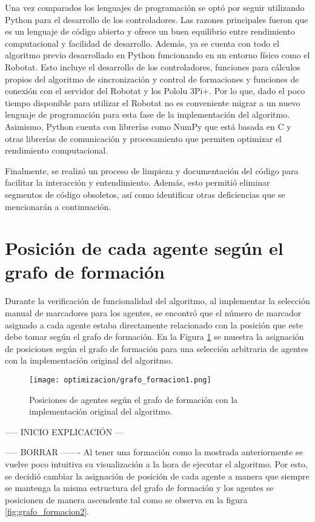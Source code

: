 Una vez comparados los lenguajes de programación se optó por seguir utilizando Python para el desarrollo de los controladores. Las razones principales fueron que es un lenguaje de código abierto y ofrece un buen equilibrio entre rendimiento computacional y facilidad de desarrollo. Además, ya se cuenta con todo el algoritmo previo desarrollado en Python funcionando en un entorno físico como el Robotat. Esto incluye el desarrollo de los controladores, funciones para cálculos propios del algoritmo de sincronización y control de formaciones y funciones de conexión con el servidor del Robotat y los Pololu 3Pi+. Por lo que, dado el poco tiempo disponible para utilizar el Robotat no es conveniente migrar a un nuevo lenguaje de programación para esta fase de la implementación del algoritmo. Asimismo, Python cuenta con librerías como NumPy que está basada en C y otras librerías de comunicación y procesamiento que permiten optimizar el rendimiento computacional.

Finalmente, se realizó un proceso de limpieza y documentación del código para facilitar la interacción y entendimiento. Además, esto permitió eliminar segmentos de código obsoletos, así como identificar otras deficiencias que se mencionarán a continuación.

\section{Posición de cada agente según el grafo de formación}
Durante la verificación de funcionalidad del algoritmo, al implementar la selección manual de marcadores para los agentes, se encontró que el número de marcador asignado a cada agente estaba directamente relacionado con la posición que este debe tomar según el grafo de formación. En la Figura \ref{fig:grafo_formacion1} se muestra la asignación de posiciones según el grafo de formación para una selección arbitraria de agentes con la implementación original del algoritmo.

\begin{figure}[H]
	\centering
	\texttt{[image: optimizacion/grafo\_formacion1.png]}
	\caption{Posiciones de agentes según el grafo de formación con la implementación original del algoritmo.}
	\label{fig:grafo_formacion1}
\end{figure}

----- INICIO EXPLICACIÓN ---




----- BORRAR -------
Al tener una formación como la mostrada anteriormente se vuelve poco intuitiva su visualización a la hora de ejecutar el algoritmo. Por esto, se decidió cambiar la asignación de posición de cada agente a manera que siempre se mantenga la misma estructura del grafo de formación y los agentes se posicionen de manera ascendente tal como se observa en la figura \ref{fig:grafo_formacion2}.

